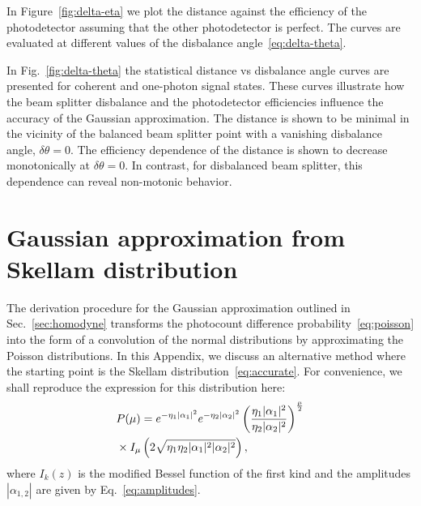 \documentclass[%
reprint,
superscriptaddress,
 amsmath,amssymb,amsfonts,
 aps,
 pra,
 longbibliography
]{revtex4-2}
\begin{document}
      In Figure~\ref{fig:delta-eta}
      we plot the distance against
      the efficiency of the photodetector assuming that the
      other photodetector is perfect.
      The curves are evaluated at different values of the
      disbalance angle~\eqref{eq:delta-theta}.

In Fig.~\ref{fig:delta-theta} 
the statistical distance vs disbalance angle
curves are presented for coherent and one-photon signal states. 
These curves illustrate how the beam splitter disbalance and
the photodetector efficiencies influence the accuracy of the
Gaussian approximation.
The distance is shown to be minimal in the vicinity of
the balanced beam splitter point with
a vanishing disbalance angle, $\delta\theta=0$.
The efficiency dependence of
the distance
is shown to decrease monotonically at $\delta\theta=0$.
In contrast, for disbalanced beam splitter, this dependence can
reveal non-motonic behavior.

\section{Gaussian approximation from Skellam distribution}
\label{sec:appendix_comparison}



The derivation procedure for the Gaussian approximation
outlined in Sec.~\ref{sec:homodyne} transforms
the photocount difference probability~\eqref{eq:poisson}
into the form of a convolution of the normal distributions
by approximating the Poisson distributions.
In this Appendix,
we discuss an alternative method
where the starting point is the Skellam distribution~\eqref{eq:accurate}.
For convenience, we shall reproduce the expression for
this distribution here:
\begin{align}
  &
\label{eq:Skellam}   
  P(\mu)=e^{-\eta_1|\alpha_1|^2}e^{-\eta_2|\alpha_2|^2}
  \left(\frac{\eta_1|\alpha_1|^2}{\eta_2|\alpha_2|^2}\right)^{\frac{\mu}{2}}
  \notag
  \\
  &
  \times
I_{\mu}\left(2\sqrt{\eta_1\eta_2|\alpha_1|^2|\alpha_2|^2}\right),
\end{align}
where $I_k(z)$ is the modified Bessel function of the first kind
and the amplitudes $|\alpha_{1,2}|$ are given by Eq.~\eqref{eq:amplitudes}.
\end{document}
